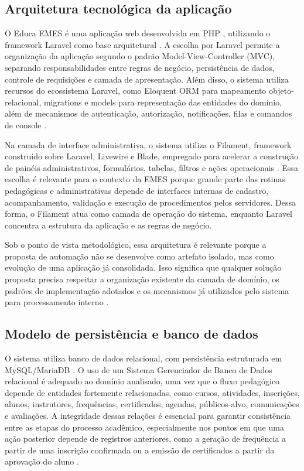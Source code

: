 \subsection{Arquitetura tecnológica da aplicação}
\label{sec:metod:analise_sis:arquitetura}

O Educa EMES é uma aplicação web desenvolvida em PHP \cite{PHP2024},
utilizando o framework Laravel como base arquitetural
\cite{Laravel2024}. A escolha por Laravel permite a organização da
aplicação segundo o padrão Model-View-Controller (MVC),
separando responsabilidades entre regras de negócio, persistência de
dados, controle de requisições e camada de apresentação. Além disso, o
sistema utiliza recursos do ecossistema Laravel, como Eloquent ORM para
mapeamento objeto-relacional, migrations e models para representação
das entidades do domínio, além de mecanismos de autenticação,
autorização, notificações, filas e comandos de console
\cite{Sommerville2011,CodingStyle2019,LaravelDocs2024,LaravelQueues2024,LaravelCommands2024}.

Na camada de interface administrativa, o sistema utiliza o Filament,
framework construído sobre Laravel, Livewire e Blade, empregado para
acelerar a construção de painéis administrativos, formulários, tabelas,
filtros e ações operacionais
\cite{Filament2024,FilamentAdminPanel2024,Livewire2024,Blade2024}. Essa
escolha é relevante para o contexto
da EMES porque grande parte das rotinas pedagógicas e administrativas
depende de interfaces internas de cadastro, acompanhamento,
validação e execução de procedimentos pelos servidores. Dessa forma, o
Filament atua como camada de operação do sistema, enquanto Laravel
concentra a estrutura da aplicação e as regras de negócio.

Sob o ponto de vista metodológico, essa arquitetura é relevante porque a
proposta de automação não se desenvolve como artefato isolado, mas como
evolução de uma aplicação já consolidada. Isso significa que qualquer
solução proposta precisa respeitar a organização existente da camada de
domínio, os padrões de implementação adotados e os mecanismos já
utilizados pelo sistema para processamento interno
\cite{Sommerville2011,Pressman2014}.

\subsection{Modelo de persistência e banco de dados}
\label{sec:metod:analise_sis:banco}

O sistema utiliza banco de dados relacional, com persistência
estruturada em MySQL/MariaDB \cite{MySQL2024}. O uso de um Sistema Gerenciador de Banco
de Dados relacional é adequado ao domínio analisado, uma vez que o
fluxo pedagógico depende de entidades fortemente relacionadas, como
cursos, atividades, inscrições, alunos, instrutores, frequências,
certificados, agendas, públicos-alvo, comunicações e avaliações. A
integridade dessas relações é essencial para garantir consistência
entre as etapas do processo acadêmico, especialmente nos pontos em que
uma ação posterior depende de registros anteriores, como a geração de
frequência a partir de uma inscrição confirmada ou a emissão de
certificados a partir da aprovação do aluno \cite{MySQL2024}.

